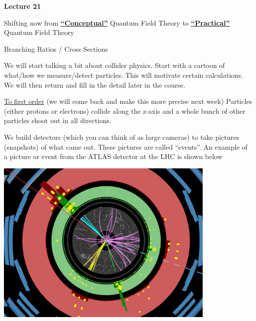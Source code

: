 



\thispagestyle{fancy}

\begin{center}
{\huge \textbf{Lecture 21}}
\end{center}

{\fontsize{14}{16}\selectfont

Shifting now from \underline{\textbf{``Conceptual''}} Quantum Field Theory to \underline{\textbf{``Practical''}} Quantum Field Theory

{\Large Branching Ratios / Cross Sections}

We will start talking a bit about collider physics. 
Start with a cartoon of what/how we measure/detect particles.
This will motivate certain calculations.  
We will then return and fill in the detail later in the course.


\underline{To first order}  (we will come back and make this more precise next week)
Particles (either protons or electrons) collide along the z-axis and a whole bunch of other particles shoot out in all directions.   

We build detectors (which you can think of as large cameras) to take pictures (snapshots) of what came out. 
These pictures are called ``events''.
An example of a picture or event from the ATLAS detector at the LHC is shown below

\bc
\includegraphics[width=0.8\textwidth]{./EventDisplayNoLabel.pdf}
\ec

\clearpage

}
